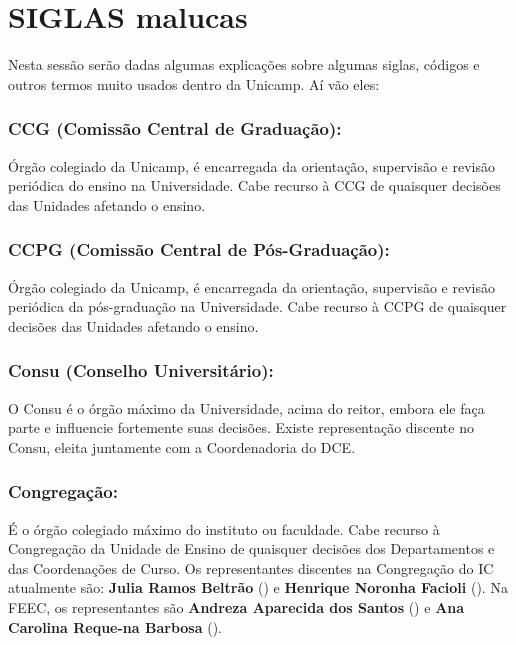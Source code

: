 
\section{SIGLAS malucas}

Nesta sessão serão dadas algumas explicações sobre algumas siglas, códigos e
outros termos muito usados dentro da Unicamp. Aí vão eles:

\subsubsection{CCG (Comissão Central de Graduação):} Órgão colegiado da Unicamp,
é encarregada da orientação, supervisão e revisão periódica do ensino na
Universidade. Cabe recurso à CCG de quaisquer decisões das Unidades afetando o
ensino.

\subsubsection{CCPG (Comissão Central de Pós-Graduação):} Órgão colegiado da
Unicamp, é encarregada da orientação, supervisão e revisão periódica da
pós-graduação na Universidade. Cabe recurso à CCPG de quaisquer decisões das
Unidades afetando o ensino.

\subsubsection{Consu (Conselho Universitário):} O Consu é o órgão máximo da
Universidade, acima do reitor, embora ele faça parte e influencie fortemente
suas decisões.  Existe representação discente no Consu, eleita juntamente com a
Coordenadoria do DCE.

\subsubsection{Congregação:} É o órgão colegiado máximo do instituto ou
faculdade.  Cabe recurso à Congregação da Unidade de Ensino de quaisquer
decisões dos Departamentos e das Coordenações de Curso. Os representantes
discentes na Congregação do IC atualmente são: \textbf{Julia Ramos Beltrão}
() e \textbf{Henrique Noronha Facioli}
(). Na FEEC, os representantes são
\textbf{Andreza Aparecida dos Santos} () e
\textbf{Ana Carolina Reque-na Barbosa} ().

